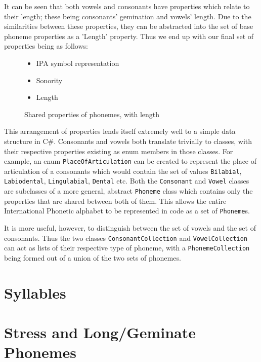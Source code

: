 \documentclass{report}
\newcommand{\Csh}{C{\lserif\#}}
\begin{document}
	It can be seen that both vowels and consonants have properties which relate to their length; these being consonants' gemination and vowels' length. Due to the similarities between these properties, they can be abstracted into the set of base phoneme properties as a 'Length' property. Thus we end up with our final set of properties being as follows:

	\begin{figure}[h]
	\caption{Shared properties of phonemes, with length}
	\label{shared properties of phonemes with length}
	\begin{tcolorbox}
		\begin{itemize}
			\item IPA symbol representation
			\item Sonority
			\item Length
		\end{itemize}
	\end{tcolorbox}
	\end{figure}

	This arrangement of properties lends itself extremely well to a simple data structure in \Csh{}. Consonants and vowels both translate trivially to classes, with their respective properties existing as enum members in those classes. For example, an enum \texttt{PlaceOfArticulation} can be created to represent the place of articulation of a consonants which would contain the set of values \texttt{Bilabial}, \texttt{Labiodental}, \texttt{Lingulabial}, \texttt{Dental} etc. Both the \texttt{Consonant} and \texttt{Vowel} classes are subclasses of a more general, abstract \texttt{Phoneme} class which contains only the properties that are shared between both of them. This allows the entire International Phonetic alphabet to be represented in code as a set of \texttt{Phoneme}s.
	
	It is more useful, however, to distinguish between the set of vowels and the set of consonants. Thus the two classes \texttt{ConsonantCollection} and \texttt{VowelCollection} can act as lists of their respective type of phoneme, with a \texttt{PhonemeCollection} being formed out of a union of the two sets of phonemes.

	\section{Syllables}
	
	\section{Stress and Long/Geminate Phonemes}
	
\end{document}
